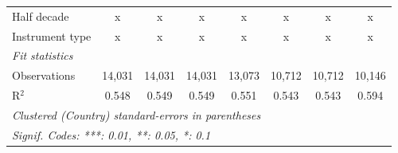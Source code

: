 \begin{tabular}{lccccccc}
   Half decade                                                                            & x            & x             & x             & x             & x            & x            & x\\  
   Instrument type                                                                        & x            & x             & x             & x             & x            & x            & x\\  
   \midrule \emph{Fit statistics}\\
   Observations                                                                           & 14,031       & 14,031        & 14,031        & 13,073        & 10,712       & 10,712       & 10,146\\  
   R$^2$                                                                                  & 0.548        & 0.549         & 0.549         & 0.551         & 0.543        & 0.543        & 0.594\\  
   \midrule
   \multicolumn{8}{l}{\emph{Clustered (Country) standard-errors in parentheses}}\\
   \multicolumn{8}{l}{\emph{Signif. Codes: ***: 0.01, **: 0.05, *: 0.1}}\\
\end{tabular}
\par\endgroup



